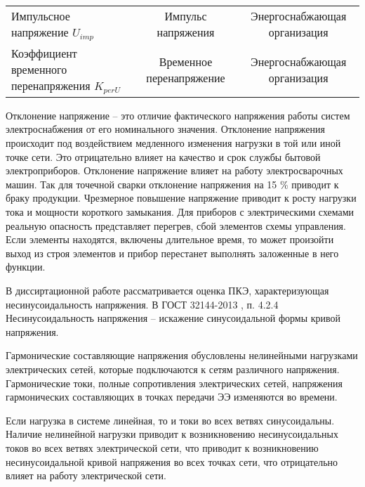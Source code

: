 \begin{table} [p]
\begin{SingleSpace}
\begin{tabulary}{\textwidth}{@{}>{\zz}L >{\zz}C >{\zz}C @{}}
			Импульсное напряжение ${U_{imp}}$ &
			Импульс напряжения &
			Энергоснабжающая организация \\
			
			Коэффициент временного перенапряжения ${K_{per U}}$ &
			Временное перенапряжение &
			Энергоснабжающая организация \\
			
			\bottomrule %
		\end{tabulary}%
	\end{SingleSpace}
\end{table}

Отклонение напряжение – это отличие фактического напряжения работы систем электроснабжения от его номинального значения. Отклонение напряжения происходит под воздействием медленного изменения нагрузки в той или иной точке сети. Это отрицательно влияет на качество и срок службы бытовой электроприборов. Отклонение напряжение влияет на работу электросварочных машин. Так для точечной сварки отклонение напряжения на 15 \% приводит к браку продукции. Чрезмерное повышение напряжение приводит к росту нагрузки тока и мощности короткого замыкания. Для приборов с электрическими схемами реальную опасность представляет перегрев, сбой элементов схемы управления. Если элементы находятся, включены длительное время, то может произойти выход из строя элементов и прибор перестанет выполнять заложенные в него функции.

В диссиртационной работе рассматривается оценка ПКЭ, характеризующая несинусоидальность напряжения. В ГОСТ 32144-2013 \cite{ГОСТ32144-2013}, п. 4.2.4 Несинусоидальность напряжения – искажение синусоидальной формы кривой напряжения.

Гармонические составляющие напряжения обусловлены нелинейными нагрузками электрических сетей, которые подключаются к сетям различного напряжения. Гармонические токи, полные сопротивления электрических сетей, напряжения гармонических составляющих в точках передачи ЭЭ изменяются во времени.

Если нагрузка в системе линейная, то и токи во всех ветвях синусоидальны. Наличие нелинейной нагрузки приводит к возникновению несинусоидальных токов во всех ветвях электрической сети, что приводит к возникновению несинусоидальной кривой напряжения во всех точках сети, что отрицательно влияет на работу электрической сети. 

